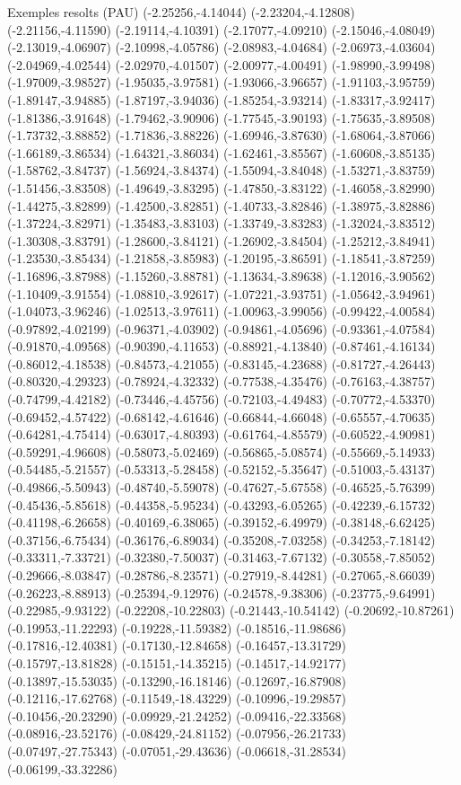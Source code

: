 \documentclass[11pt,a4paper]{article}
\begin{document}
\begin{fmex}{Exemples resolts (PAU)}
(-2.25256,-4.14044) (-2.23204,-4.12808) (-2.21156,-4.11590) (-2.19114,-4.10391) (-2.17077,-4.09210) (-2.15046,-4.08049) (-2.13019,-4.06907) (-2.10998,-4.05786) (-2.08983,-4.04684) (-2.06973,-4.03604) (-2.04969,-4.02544) (-2.02970,-4.01507) (-2.00977,-4.00491) (-1.98990,-3.99498) (-1.97009,-3.98527) (-1.95035,-3.97581) (-1.93066,-3.96657) (-1.91103,-3.95759) (-1.89147,-3.94885) (-1.87197,-3.94036) (-1.85254,-3.93214) (-1.83317,-3.92417) (-1.81386,-3.91648) (-1.79462,-3.90906) (-1.77545,-3.90193) (-1.75635,-3.89508) (-1.73732,-3.88852) (-1.71836,-3.88226) (-1.69946,-3.87630) (-1.68064,-3.87066) (-1.66189,-3.86534) (-1.64321,-3.86034) (-1.62461,-3.85567) (-1.60608,-3.85135) (-1.58762,-3.84737) (-1.56924,-3.84374) (-1.55094,-3.84048) (-1.53271,-3.83759) (-1.51456,-3.83508) (-1.49649,-3.83295) (-1.47850,-3.83122) (-1.46058,-3.82990) (-1.44275,-3.82899) (-1.42500,-3.82851) (-1.40733,-3.82846) (-1.38975,-3.82886) (-1.37224,-3.82971) (-1.35483,-3.83103) (-1.33749,-3.83283) (-1.32024,-3.83512) (-1.30308,-3.83791) (-1.28600,-3.84121) (-1.26902,-3.84504) (-1.25212,-3.84941) (-1.23530,-3.85434) (-1.21858,-3.85983) (-1.20195,-3.86591) (-1.18541,-3.87259) (-1.16896,-3.87988) (-1.15260,-3.88781) (-1.13634,-3.89638) (-1.12016,-3.90562) (-1.10409,-3.91554) (-1.08810,-3.92617) (-1.07221,-3.93751) (-1.05642,-3.94961) (-1.04073,-3.96246) (-1.02513,-3.97611) (-1.00963,-3.99056) (-0.99422,-4.00584) (-0.97892,-4.02199) (-0.96371,-4.03902) (-0.94861,-4.05696) (-0.93361,-4.07584) (-0.91870,-4.09568) (-0.90390,-4.11653) (-0.88921,-4.13840) (-0.87461,-4.16134) (-0.86012,-4.18538) (-0.84573,-4.21055) (-0.83145,-4.23688) (-0.81727,-4.26443) (-0.80320,-4.29323) (-0.78924,-4.32332) (-0.77538,-4.35476) (-0.76163,-4.38757) (-0.74799,-4.42182) (-0.73446,-4.45756) (-0.72103,-4.49483) (-0.70772,-4.53370) (-0.69452,-4.57422) (-0.68142,-4.61646) (-0.66844,-4.66048) (-0.65557,-4.70635) (-0.64281,-4.75414) (-0.63017,-4.80393) (-0.61764,-4.85579) (-0.60522,-4.90981) (-0.59291,-4.96608) (-0.58073,-5.02469) (-0.56865,-5.08574) (-0.55669,-5.14933) (-0.54485,-5.21557) (-0.53313,-5.28458) (-0.52152,-5.35647) (-0.51003,-5.43137) (-0.49866,-5.50943) (-0.48740,-5.59078) (-0.47627,-5.67558) (-0.46525,-5.76399) (-0.45436,-5.85618) (-0.44358,-5.95234) (-0.43293,-6.05265) (-0.42239,-6.15732) (-0.41198,-6.26658) (-0.40169,-6.38065) (-0.39152,-6.49979) (-0.38148,-6.62425) (-0.37156,-6.75434) (-0.36176,-6.89034) (-0.35208,-7.03258) (-0.34253,-7.18142) (-0.33311,-7.33721) (-0.32380,-7.50037) (-0.31463,-7.67132) (-0.30558,-7.85052) (-0.29666,-8.03847) (-0.28786,-8.23571) (-0.27919,-8.44281) (-0.27065,-8.66039) (-0.26223,-8.88913) (-0.25394,-9.12976) (-0.24578,-9.38306) (-0.23775,-9.64991) (-0.22985,-9.93122) (-0.22208,-10.22803) (-0.21443,-10.54142) (-0.20692,-10.87261) (-0.19953,-11.22293) (-0.19228,-11.59382) (-0.18516,-11.98686) (-0.17816,-12.40381) (-0.17130,-12.84658) (-0.16457,-13.31729) (-0.15797,-13.81828) (-0.15151,-14.35215) (-0.14517,-14.92177) (-0.13897,-15.53035) (-0.13290,-16.18146) (-0.12697,-16.87908) (-0.12116,-17.62768) (-0.11549,-18.43229) (-0.10996,-19.29857) (-0.10456,-20.23290) (-0.09929,-21.24252) (-0.09416,-22.33568) (-0.08916,-23.52176) (-0.08429,-24.81152) (-0.07956,-26.21733) (-0.07497,-27.75343) (-0.07051,-29.43636) (-0.06618,-31.28534) (-0.06199,-33.32286) 
\end{fmex}
\end{document}
